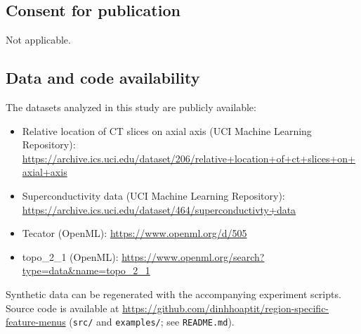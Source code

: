 \documentclass[pdflatex,sn-basic,Numbered]{sn-jnl}
\begin{document}
\subsection*{Consent for publication}
Not applicable.

\subsection*{Data and code availability}
The datasets analyzed in this study are publicly available:
\begin{itemize}
  \item Relative location of CT slices on axial axis (UCI Machine Learning Repository): \url{https://archive.ics.uci.edu/dataset/206/relative+location+of+ct+slices+on+axial+axis}
  \item Superconductivity data (UCI Machine Learning Repository): \url{https://archive.ics.uci.edu/dataset/464/superconductivty+data}
  \item Tecator (OpenML): \url{https://www.openml.org/d/505}
  \item topo\_2\_1 (OpenML): \url{https://www.openml.org/search?type=data&name=topo_2_1}
\end{itemize}
Synthetic data can be regenerated with the accompanying experiment scripts. Source code is available at \url{https://github.com/dinhhoaptit/region-specific-feature-menus} (\texttt{src/} and \texttt{examples/}; see \texttt{README.md}).


\end{document}
